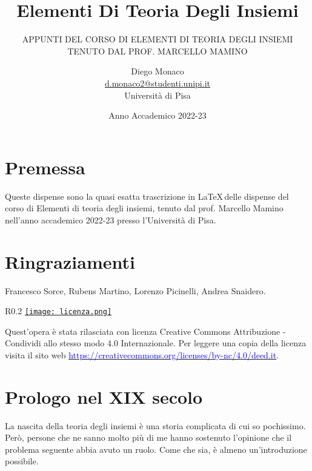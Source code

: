 \documentclass[11pt]{scrartcl}
\begin{document}
\title{Elementi Di Teoria Degli Insiemi}
\subtitle{\large\normalfont\rmfamily\scshape APPUNTI DEL CORSO DI ELEMENTI DI TEORIA DEGLI INSIEMI \\ TENUTO DAL PROF. MARCELLO MAMINO}
\author{Diego Monaco \\ \textnormal{\href{d.monaco2@studenti.unipi.it}{d.monaco2@studenti.unipi.it}} \\ Università di Pisa}
\date{Anno Accademico 2022-23}
\maketitle
\newpage

\tableofcontents
\eject
\newpage

\section*{Premessa}
Queste dispense sono la quasi esatta trascrizione in \LaTeX\,delle dispense del corso di Elementi di teoria degli insiemi, tenuto dal prof. Marcello Mamino nell'anno accademico 2022-23 presso l'Università di Pisa.

\section*{Ringraziamenti}
Francesco Sorce, Rubens Martino, Lorenzo Picinelli, Andrea Snaidero.

\mbox{}
\vfill
\begin{wrapfigure}{R}{0.2\textwidth}
	\centering
	\href{https://creativecommons.org/licenses/by-nc/4.0/deed.it}{\texttt{[image: licenza.png]}}
\end{wrapfigure}

Quest'opera è stata rilasciata con licenza Creative Commons Attribuzione - Condividi allo stesso modo 4.0 Internazionale. Per leggere
una copia della licenza visita il sito web \href{http://creativecommons.org/licenses/by-sa/4.0/deed.it}{\textcolor{blue}{https://creativecommons.org/licenses/by-nc/4.0/deed.it}}.\\

\newpage
\section{Prologo nel XIX secolo}
La nascita della teoria degli insiemi è una storia complicata di cui so pochissimo. Però, persone che ne sanno molto più di me hanno sostenuto l'opinione che il problema seguente
abbia avuto un ruolo. Come che sia, è almeno un'introduzione possibile.
\end{document}
